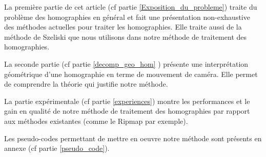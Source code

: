 	La première partie de cet article (cf partie \ref{Exposition_du_probleme}) traite du problème des homographies en général et fait une présentation non-exhaustive des méthodes actuelles pour traiter les homographies. Elle traite aussi de la méthode de Szeliski que nous utilisons dans notre méthode de traitement des homographies.

	La seconde partie (cf partie \ref{decomp_geo_hom} ) présente une interprétation géométrique d'une homographie en terme de mouvement de caméra. Elle permet de comprendre la théorie qui justifie notre méthode.

	La partie expérimentale (cf partie \ref{experiences}) montre les performances et le gain en qualité de notre méthode de traitement des homographies par rapport aux méthodes existantes (comme le Ripmap par exemple).

	Les pseudo-codes permettant de mettre en oeuvre notre méthode sont présents en annexe (cf partie \ref{pseudo_code}).
